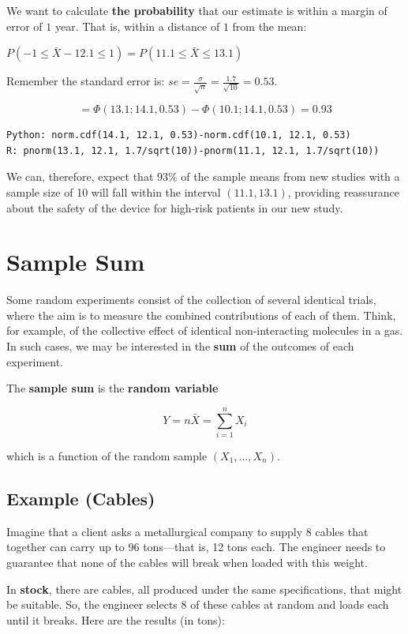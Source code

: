 \documentclass[
]{book}
\begin{document}
We want to calculate \textbf{the probability} that our estimate is within a margin of error of \(1\) year. That is, within a distance of \(1\) from the mean:

\(P(-1 \leq \bar{X} - 12.1 \leq 1) = P(11.1 \leq \bar{X} \leq 13.1)\)

Remember the standard error is: \(se=\frac{\sigma}{\sqrt{n}}=\frac{1.7}{\sqrt{10}}= 0.53\).

\[=\Phi(13.1; 14.1, 0.53)-\Phi(10.1; 14.1, 0.53)=0.93\]

\begin{verbatim}
Python: norm.cdf(14.1, 12.1, 0.53)-norm.cdf(10.1, 12.1, 0.53)
R: pnorm(13.1, 12.1, 1.7/sqrt(10))-pnorm(11.1, 12.1, 1.7/sqrt(10))
\end{verbatim}

We can, therefore, expect that \(93\%\) of the sample means from new studies with a sample size of 10 will fall within the interval \((11.1, 13.1)\), providing reassurance about the safety of the device for high-risk patients in our new study.

\hypertarget{sample-sum}{%
\section{Sample Sum}\label{sample-sum}}

Some random experiments consist of the collection of several identical trials, where the aim is to measure the combined contributions of each of them. Think, for example, of the collective effect of identical non-interacting molecules in a gas. In such cases, we may be interested in the \textbf{sum} of the outcomes of each experiment.

The \textbf{sample sum} is the \textbf{random variable}

\[
Y = n \bar{X} = \sum_{i=1}^n X_i
\]

which is a function of the random sample \((X_1, \ldots, X_n)\).

\hypertarget{example-cables}{%
\subsection{Example (Cables)}\label{example-cables}}

Imagine that a client asks a metallurgical company to supply 8 cables that together can carry up to 96 tons---that is, 12 tons each. The engineer needs to guarantee that none of the cables will break when loaded with this weight.

In \textbf{stock}, there are cables, all produced under the same specifications, that might be suitable. So, the engineer selects 8 of these cables at random and loads each until it breaks. Here are the results (in tons):
\end{document}
